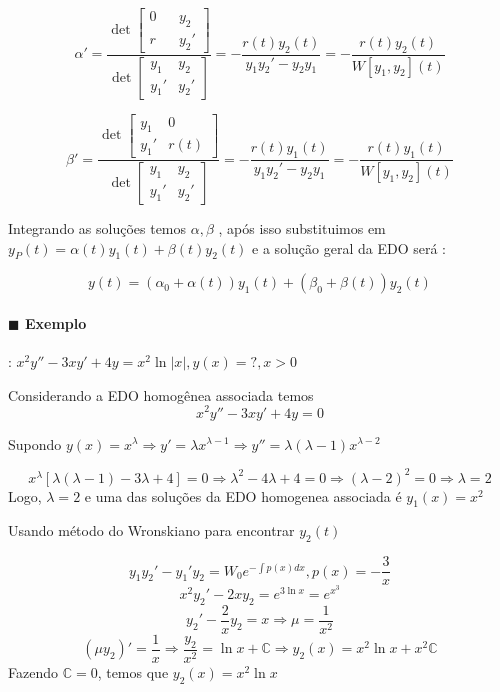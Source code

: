 \[  \alpha  ' = \frac{\det \begin{bmatrix} 0 && y_2 \\ r && y_2' \end{bmatrix} }{\det \begin{bmatrix}
y_1 & y_2 \\ y_1 ' & y_2 ' \end{bmatrix}} = -
\frac{r(t) y_2 (t) }{y_1 y_2' - y_2 y_1 } = - \frac{r(t) y_2(t) }{W[y_1, y_2](t)} \]

\[  \beta  ' = \frac{\det \begin{bmatrix} y_1 & 0 \\ y_1 ' & r(t) \end{bmatrix} }{\det \begin{bmatrix}
y_1 & y_2 \\ y_1 ' & y_2 ' \end{bmatrix}} = -
\frac{r(t) y_1 (t) }{y_1 y_2' - y_2 y_1 } = - \frac{r(t) y_1(t) }{W[y_1, y_2](t)} \]


Integrando as soluções temos \( \alpha , \beta \) , após isso substituimos em \( y_P(t) = \alpha (t)
y_1(t) + \beta (t) y_2(t)\)  e a
solução geral da EDO será :


\begin{equation}
  y(t) = \left( \alpha _0 + \alpha (t) \right) y_1(t) + \left( \beta _0 + \beta (t) \right)y_2(t) 
  \label{eq:solucao_geral_inomogenea}
\end{equation}

 \paragraph{$\blacksquare$ Exemplo} : \( x^2 y '' - 3x y' + 4y = x^2 \ln |x| , y(x) = ?, x> 0 \) 

 Considerando a EDO homogênea associada temos
 \[ x^2 y'' - 3xy' + 4y = 0  \]

 Supondo \( y(x) = x^{\lambda } \Rightarrow y' = \lambda x^{\lambda -1} \Rightarrow y'' = \lambda
 (\lambda - 1) x^{\lambda - 2}  \) 
 
 \[ x^{\lambda } \left[ \lambda (\lambda - 1) - 3 \lambda  + 4  \right] = 0 \Rightarrow \lambda
   ^2 - 4 \lambda  + 4 = 0 \Rightarrow \left( \lambda - 2 \right)^2 = 0 \Rightarrow \lambda  = 2 \]
 Logo, \( \lambda = 2 \) e uma das soluções da EDO homogenea associada é \( y_1 (x) = x^2 \) 
 
 
 Usando método do Wronskiano para encontrar \( y_2(t) \)
 
 \[ y_1 y_2 ' - y_1 ' y_2 = W_0 e^{- \int p(x) dx}, p(x) = - \frac{3}{x} \]
 \[ x^2 y_2 ' - 2x y_2 = e^{3 \ln x} = e^{x^3}  \]
 \[ y_2 ' - \frac{2}{x} y_2 = x \Rightarrow \mu = \frac{1}{x^2} \]
 \[ \left( \mu y_2 \right)' = \frac{1}{x} \Rightarrow \frac{y_2}{x^2} = \ln x + \mathbb{C}
   \Rightarrow y_2(x) = x^2 \ln x + x^2 \mathbb{C}\]
 Fazendo \( \mathbb{C} = 0 \), temos que \( y_2(x) = x^2 \ln x \) 
 
